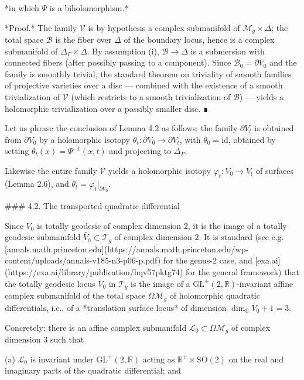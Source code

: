*in which $\Psi$ is a biholomorphism.*

*Proof.* The family $\mathcal{V}$ is by hypothesis a complex submanifold of $\mathcal{M}_g \times \Delta$; the total space $\mathcal{B}$ is the fiber over $\Delta$ of the boundary locus, hence is a complex submanifold of $\Delta_\Gamma \times \Delta$. By assumption (i), $\mathcal{B} \to \Delta$ is a submersion with connected fibers (after possibly passing to a component). Since $\mathcal{B}_0 = \partial V_0$ and the family is smoothly trivial, the standard theorem on triviality of smooth families of projective varieties over a disc — combined with the existence of a smooth trivialization of $\mathcal{V}$ (which restricts to a smooth trivialization of $\mathcal{B}$) — yields a holomorphic trivialization over a possibly smaller disc. ∎

Let us phrase the conclusion of Lemma 4.2 as follows: the family $\partial V_t$ is obtained from $\partial V_0$ by a holomorphic isotopy $\theta_t : \partial V_0 \to \partial V_t$, with $\theta_0 = \mathrm{id}$, obtained by setting $\theta_t(x) = \Psi^{-1}(x, t)$ and projecting to $\Delta_\Gamma$.

Likewise the entire family $\mathcal{V}$ yields a holomorphic isotopy $\varphi_t : V_0 \to V_t$ of surfaces (Lemma 2.6), and $\theta_t = \varphi_t|_{\partial V_0}$.

### 4.2. The transported quadratic differential

Since $V_0$ is totally geodesic of complex dimension $2$, it is the image of a totally geodesic submanifold $\widetilde{V_0} \subset \mathcal{T}_g$ of complex dimension $2$. It is standard (see e.g. [annals.math.princeton.edu](https://annals.math.princeton.edu/wp-content/uploads/annals-v185-n3-p06-p.pdf) for the genus-$2$ case, and [exa.ai](https://exa.ai/library/publication/hqv57pktg74) for the general framework) that the totally geodesic locus $\widetilde{V_0}$ in $\mathcal{T}_g$ is the image of a $\mathrm{GL}^+(2, \mathbb{R})$-invariant affine complex submanifold of the total space $\Omega \mathcal{M}_g$ of holomorphic quadratic differentials, i.e., of a *translation surface locus* of dimension $\dim_{\mathbb{C}} \widetilde{V_0} + 1 = 3$.

Concretely: there is an affine complex submanifold $\mathcal{L}_0 \subset \Omega \mathcal{M}_g$ of complex dimension $3$ such that

(a) $\mathcal{L}_0$ is invariant under $\mathrm{GL}^+(2,\mathbb{R})$ acting as $\mathbb{R}^+ \times \mathrm{SO}(2)$ on the real and imaginary parts of the quadratic differential; and

